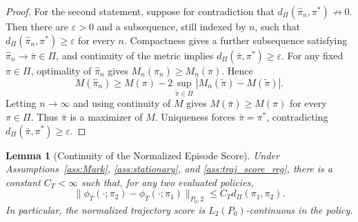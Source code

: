 \documentclass[12pt]{article}
\newtheorem{lemma}[theorem]{Lemma}
\theoremstyle{remark}\newtheorem{remark}[theorem]{Remark}\theoremstyle{plain}
\begin{document}
\begin{proof}
    For the second statement, suppose for contradiction that
    $d_\Pi(\widehat\pi_n,\pi^*)\not\to0$.  Then there are
    $\varepsilon>0$ and a subsequence, still indexed by $n$, such
    that
    $d_\Pi(\widehat\pi_n,\pi^*)\geq\varepsilon$ for every $n$.
    Compactness gives a further subsequence satisfying
    $\widehat\pi_n\to\bar\pi\in\Pi$, and continuity of the metric
    implies $d_\Pi(\bar\pi,\pi^*)\geq\varepsilon$.
    For any fixed $\pi\in\Pi$, optimality of $\widehat\pi_n$ gives
    $M_n(\widehat\pi_n)\geq M_n(\pi)$.  Hence
    \[
        M(\widehat\pi_n)
        \geq M(\pi)
        -2\sup_{\widetilde\pi\in\Pi}
        |M_n(\widetilde\pi)-M(\widetilde\pi)|.
    \]
    Letting $n\to\infty$ and using continuity of $M$ gives
    $M(\bar\pi)\geq M(\pi)$ for every $\pi\in\Pi$.  Thus
    $\bar\pi$ is a maximizer of $M$.  Uniqueness forces
    $\bar\pi=\pi^*$, contradicting
    $d_\Pi(\bar\pi,\pi^*)\geq\varepsilon$.
\end{proof}

\begin{lemma}[Continuity of the Normalized Episode Score]
\label{lem:episode_score_continuity}
    Under Assumptions~\ref{ass:Mark}, \ref{ass:stationary}, and
    \ref{ass:traj_score_reg}, there is a constant $C_T<\infty$ such
    that, for any two evaluated policies,
    \[
        \|\phi_T(\cdot;\pi_2)-\phi_T(\cdot;\pi_1)\|_{P_0,2}
        \leq C_T d_\Pi(\pi_1,\pi_2).
    \]
    In particular, the normalized trajectory score is
    $L_2(P_0)$-continuous in the policy.
\end{lemma}
\end{document}
